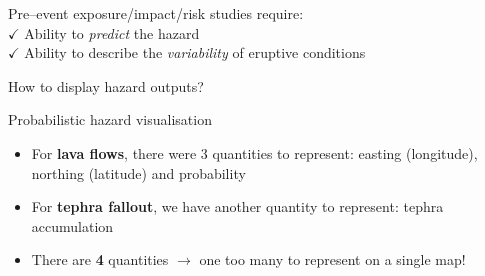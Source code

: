 \documentclass[10pt,aspectratio=169]{beamer}
\begin{document}
\begin{frame}[standout]
  Pre--event exposure/impact/risk studies require:\\ \vspace*{1em}
  \alert{$\checkmark$ \textnormal{Ability to \textit{predict} the hazard}}\\
  \alert{$\checkmark$ \textnormal{Ability to describe the \textit{variability} of eruptive conditions}}
\end{frame}

\begin{frame}[standout]
  How to display hazard outputs?
\end{frame}

\begin{frame}{Probabilistic hazard visualisation}
  \begin{itemize}
    \item For \textbf{lava flows}, there were 3 quantities to represent: \alert{easting} (longitude), \alert{northing} (latitude) and \alert{probability} \vspace*{1em}
    \item For \textbf{tephra fallout}, we have another quantity to represent: \alert{tephra accumulation}\vspace*{1em}
    \item There are \textbf{4} quantities $\rightarrow$ \alert{one too many to represent on a single map}!
  \end{itemize}
\end{frame}
\end{document}
